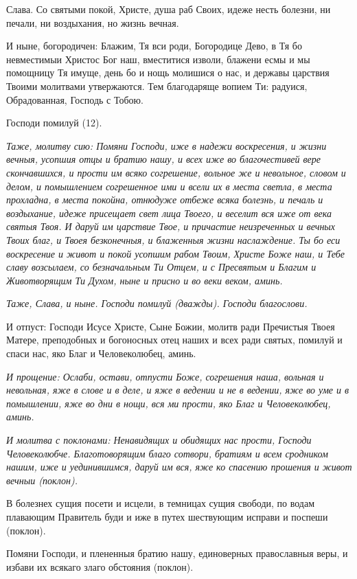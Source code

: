 Слава. Со святыми покой, Христе, душа раб Своих, идеже несть болезни, ни печали, ни воздыхания, но жизнь вечная. 

И ныне, богородичен: Блажим, Тя вси роди, Богородице Дево, в Тя бо невместимыи Христос Бог наш, вместитися изволи, блажени есмы и мы помощницу Тя имуще, день бо и нощь молишися о нас, и державы царствия Твоими молитвами утвержаются. Тем благодаряще вопием Ти: радуися, Обрадованная, Господь с Тобою. 

Господи помилуй (12).


\itshape Таже, молитву сию:\normalfont{} Помяни Господи, иже в надежи воскресения, и жизни вечныя, усопшия отцы и братию нашу, и всех иже во благочестивей вере скончавшихся, и прости им всяко согрешение, вольное же и невольное, словом и делом, и помышлением согрешенное ими и всели их в места светла, в места прохладна, в места покойна, отнюдуже отбеже всяка болезнь, и печаль и воздыхание, идеже присещает свет лица Твоего, и веселит вся иже от века святыя Твоя. И даруй им царствие Твое, и причастие неизреченных и вечных Твоих благ, и Твоея безконечныя, и блаженныя жизни наслаждение. Ты бо еси воскресение и живот и покой усопшим рабом Твоим, Христе Боже наш, и Тебе славу возсылаем, со безначальным Ти Отцем, и с Пресвятым и Благим и Животворящим Ти Духом, ныне и присно и во веки веком, аминь. 

\itshape Таже, Слава, и ныне. Господи помилуй (дважды). Господи благослови. 

И отпуст:\normalfont{} Господи Исусе Христе, Сыне Божии, молитв ради Пречистыя Твоея Матере, преподобных и богоносных отец наших и всех ради святых, помилуй и спаси нас, яко Благ и Человеколюбец, аминь. 

\itshape И прощение:\normalfont{} Ослаби, остави, отпусти Боже, согрешения наша, вольная и невольная, яже в слове и в деле, и яже в ведении и не в ведении, яже во уме и в помышлении, яже во дни в нощи, вся ми прости, яко Благ и Человеколюбец, аминь.


\itshape И молитва с поклонами:\normalfont{} Ненавидящих и обидящих нас прости, Господи Человеколюбче. Благотоворящим благо сотвори, братиям и всем сродником нашим, иже и уединившимся, даруй им вся, яже ко спасению прошения и живот вечныи (поклон). 

В болезнех сущия посети и исцели, в темницах сущия свободи, по водам плавающим Правитель буди и иже в путех шествующим исправи и поспеши (поклон). 

Помяни Господи, и плененныя братию нашу, единоверных православныя веры, и избави их всякаго злаго обстояния (поклон). 

